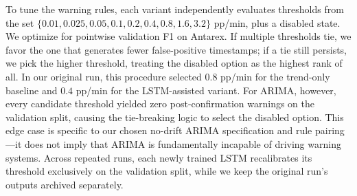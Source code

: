 \documentclass{llncs}
\begin{document}
To tune the warning rules, each variant independently evaluates thresholds from the set $\{0.01, 0.025, 0.05, 0.1, 0.2, 0.4, 0.8, 1.6, 3.2\}$ pp/min, plus a disabled state. We optimize for pointwise validation F1 on Antarex. If multiple thresholds tie, we favor the one that generates fewer false-positive timestamps; if a tie still persists, we pick the higher threshold, treating the disabled option as the highest rank of all. In our original run, this procedure selected $0.8$ pp/min for the trend-only baseline and $0.4$ pp/min for the LSTM-assisted variant. For ARIMA, however, every candidate threshold yielded zero post-confirmation warnings on the validation split, causing the tie-breaking logic to select the disabled option. This edge case is specific to our chosen no-drift ARIMA specification and rule pairing---it does not imply that ARIMA is fundamentally incapable of driving warning systems. Across repeated runs, each newly trained LSTM recalibrates its threshold exclusively on the validation split, while we keep the original run's outputs archived separately.
\end{document}
